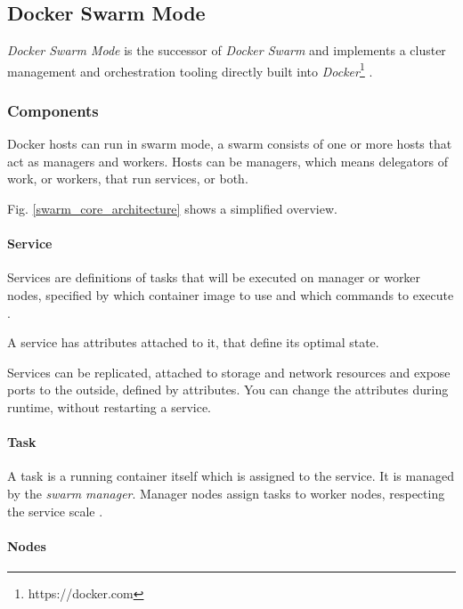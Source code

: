 \subsection{Docker Swarm Mode}\label{docker-swarm-mode}

\emph{Docker Swarm Mode} is the successor of \emph{Docker Swarm} and
implements a cluster management and orchestration tooling directly built
into \emph{Docker}\footnote{https://docker.com} .

\subsubsection{Components}\label{components}

Docker hosts can run in swarm mode, a swarm consists of one or more
hosts that act as managers and workers. Hosts can be managers, which
means delegators of work, or workers, that run services, or both.
\cite{dock-swarm}

Fig. \ref{swarm_core_architecture} shows a simplified overview.

\paragraph{Service}\label{service}

Services are definitions of tasks that will be executed on manager or
worker nodes, specified by which container image to use and which
commands to execute \cite{dock-swarm}.

A service has attributes attached to it, that define its optimal state.

Services can be replicated, attached to storage and network resources
and expose ports to the outside, defined by attributes. You can change
the attributes during runtime, without restarting a service.
\cite{dock-swarm}

\paragraph{Task}\label{task}

A task is a running container itself which is assigned to the service.
It is managed by the \emph{swarm manager}. Manager nodes assign tasks to
worker nodes, respecting the service scale \cite{dock-swarm}.

\paragraph{Nodes}\label{nodes}

